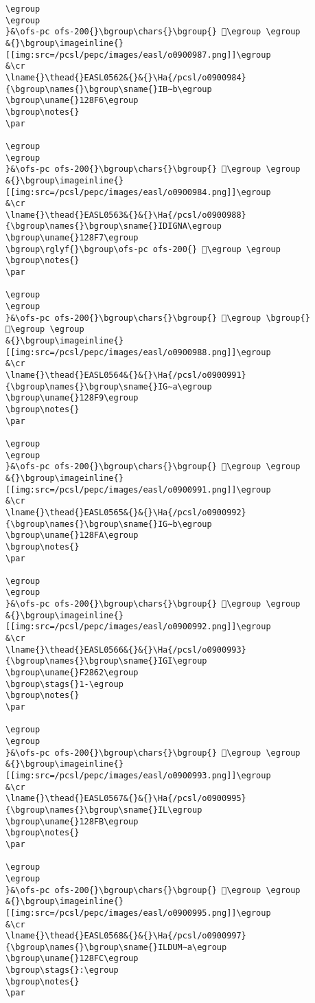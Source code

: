 \begin{verbatim}
\egroup
\egroup
}&\ofs-pc ofs-200{}\bgroup\chars{}\bgroup{} 𒣵\egroup \egroup
&{}\bgroup\imageinline{}[[img:src=/pcsl/pepc/images/easl/o0900987.png]]\egroup
&\cr
\lname{}\thead{}EASL0562&{}&{}\Ha{/pcsl/o0900984}{\bgroup\names{}\bgroup\sname{}IB∼b\egroup
\bgroup\uname{}128F6\egroup
\bgroup\notes{}
\par 

\egroup
\egroup
}&\ofs-pc ofs-200{}\bgroup\chars{}\bgroup{} 𒣶\egroup \egroup
&{}\bgroup\imageinline{}[[img:src=/pcsl/pepc/images/easl/o0900984.png]]\egroup
&\cr
\lname{}\thead{}EASL0563&{}&{}\Ha{/pcsl/o0900988}{\bgroup\names{}\bgroup\sname{}IDIGNA\egroup
\bgroup\uname{}128F7\egroup
\bgroup\rglyf{}\bgroup\ofs-pc ofs-200{} 𒣷\egroup \egroup
\bgroup\notes{}
\par 

\egroup
\egroup
}&\ofs-pc ofs-200{}\bgroup\chars{}\bgroup{} 𒣸\egroup \bgroup{} 𒣷\egroup \egroup
&{}\bgroup\imageinline{}[[img:src=/pcsl/pepc/images/easl/o0900988.png]]\egroup
&\cr
\lname{}\thead{}EASL0564&{}&{}\Ha{/pcsl/o0900991}{\bgroup\names{}\bgroup\sname{}IG∼a\egroup
\bgroup\uname{}128F9\egroup
\bgroup\notes{}
\par 

\egroup
\egroup
}&\ofs-pc ofs-200{}\bgroup\chars{}\bgroup{} 𒣹\egroup \egroup
&{}\bgroup\imageinline{}[[img:src=/pcsl/pepc/images/easl/o0900991.png]]\egroup
&\cr
\lname{}\thead{}EASL0565&{}&{}\Ha{/pcsl/o0900992}{\bgroup\names{}\bgroup\sname{}IG∼b\egroup
\bgroup\uname{}128FA\egroup
\bgroup\notes{}
\par 

\egroup
\egroup
}&\ofs-pc ofs-200{}\bgroup\chars{}\bgroup{} 𒣺\egroup \egroup
&{}\bgroup\imageinline{}[[img:src=/pcsl/pepc/images/easl/o0900992.png]]\egroup
&\cr
\lname{}\thead{}EASL0566&{}&{}\Ha{/pcsl/o0900993}{\bgroup\names{}\bgroup\sname{}IGI\egroup
\bgroup\uname{}F2862\egroup
\bgroup\stags{}1-\egroup
\bgroup\notes{}
\par 

\egroup
\egroup
}&\ofs-pc ofs-200{}\bgroup\chars{}\bgroup{} 󲡢\egroup \egroup
&{}\bgroup\imageinline{}[[img:src=/pcsl/pepc/images/easl/o0900993.png]]\egroup
&\cr
\lname{}\thead{}EASL0567&{}&{}\Ha{/pcsl/o0900995}{\bgroup\names{}\bgroup\sname{}IL\egroup
\bgroup\uname{}128FB\egroup
\bgroup\notes{}
\par 

\egroup
\egroup
}&\ofs-pc ofs-200{}\bgroup\chars{}\bgroup{} 𒣻\egroup \egroup
&{}\bgroup\imageinline{}[[img:src=/pcsl/pepc/images/easl/o0900995.png]]\egroup
&\cr
\lname{}\thead{}EASL0568&{}&{}\Ha{/pcsl/o0900997}{\bgroup\names{}\bgroup\sname{}ILDUM∼a\egroup
\bgroup\uname{}128FC\egroup
\bgroup\stags{}:\egroup
\bgroup\notes{}
\par 


\end{verbatim}
